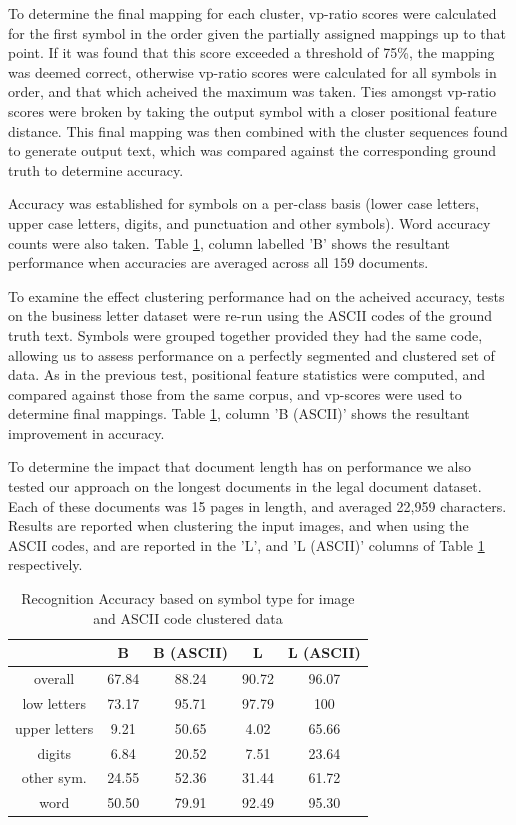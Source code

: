 \documentclass[times, 10pt,twocolumn]{article}
\begin{document}
To determine the final mapping for each cluster, vp-ratio scores were
calculated for the first symbol in the order given the partially assigned
mappings up to that point.  If it was found that this score exceeded a 
threshold of 75\%, the mapping was deemed correct, otherwise vp-ratio scores
were calculated for all symbols in order, and that which acheived the maximum
was taken.  Ties amongst vp-ratio scores were broken by taking the output
symbol with a closer positional feature distance.  This final mapping was then
combined with the cluster sequences found to generate output text, which was
compared against the corresponding ground truth to determine accuracy.

Accuracy was established for symbols on a per-class basis (lower case letters, 
upper case letters, digits, and punctuation and other symbols).  Word accuracy
counts were also taken.  Table \ref{acc_tbl}, column labelled 'B' shows the 
resultant performance when accuracies are averaged across all 159 documents.

To examine the effect clustering performance had on the acheived accuracy,
tests on the business letter dataset were re-run using the ASCII codes of the
ground truth text.  Symbols were grouped together provided they had the same
code, allowing us to assess performance on a perfectly segmented and clustered 
set of data.  As in the previous test, positional feature statistics were
computed, and compared against those from the same corpus, and vp-scores were
used to determine final mappings.  Table \ref{acc_tbl}, column 'B (ASCII)'
shows the resultant improvement in accuracy.

To determine the impact that document length has on performance we also tested 
our approach on the longest documents in the legal document dataset.  Each of 
these documents was 15 pages in length, and averaged 22,959 characters.
Results are reported when clustering the input images, and when using the ASCII
codes, and are reported in the 'L', and 'L (ASCII)' columns of Table
\ref{acc_tbl} respectively.

\begin{table}[ht]
  \begin{tabular}{|c|c|c|c|c|}
    \hline
    & B & B (ASCII) & L & L (ASCII)\\
    \hline
    \hline
    overall & 67.84 & 88.24 & 90.72 & 96.07\\
    \hline
    low letters & 73.17 & 95.71 & 97.79 & 100\\
    \hline
    upper letters & 9.21 & 50.65 & 4.02 & 65.66\\
    \hline
    digits & 6.84 & 20.52 & 7.51 & 23.64\\
    \hline
    other sym. & 24.55 & 52.36 & 31.44 & 61.72\\
    \hline
    word & 50.50 & 79.91 & 92.49 & 95.30\\
    \hline
  \end{tabular}
  \caption{Recognition Accuracy based on symbol type for image and ASCII code
           clustered data}
  \label{acc_tbl}
\end{table}
\end{document}
